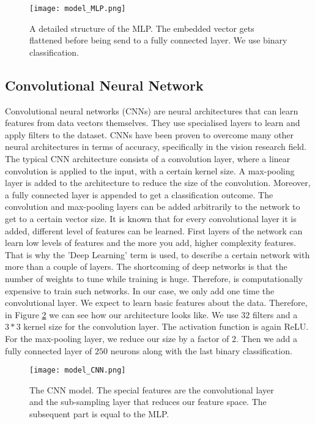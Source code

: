 \documentclass[conference]{IEEEtran}
\theoremstyle{plain}
\theoremstyle{definition}
\theoremstyle{remark}
\begin{document}
\begin{figure}[tbp!]
	\centering
	\texttt{[image: model\_MLP.png]}
	\caption[bla.]{A detailed structure of the MLP. The embedded vector gets flattened before being send to a fully connected layer. We use binary classification.}
	\label{fig:mlp}
\end{figure}
\newpage
\subsection{Convolutional Neural Network}
Convolutional neural networks (CNNs) \cite{cnn, cnn2} are neural architectures that can learn features from data vectors themselves. They use specialised layers to learn and apply filters to the dataset. CNNs have been proven to overcome many other neural architectures in terms of accuracy, specifically in the vision research field. The typical CNN architecture consists of a convolution layer, where a linear convolution is applied to the input, with a certain kernel size. A max-pooling layer is added to the architecture to reduce the size of the convolution. Moreover, a fully connected layer is appended to get a classification outcome. The convolution and max-pooling layers can be added arbitrarily to the network to get to a certain vector size. It is known that for every convolutional layer it is added, different level of features can be learned. First layers of the network can learn low levels of features and the more you add, higher complexity features. That is why the 'Deep Learning' term is used, to describe a certain network with more than a couple of layers. The shortcoming of deep networks is that the number of weights to tune while training is huge. Therefore, is computationally expensive to train such networks. In our case, we only add one time the convolutional layer. We expect to learn basic features about the data. Therefore, in Figure \ref{fig:cnn} we can see how our architecture looks like.  We use $32$ filters and a $3*3$ kernel size for the convolution layer. The activation function is again ReLU. For the max-pooling layer, we reduce our size by a factor of $2$. Then we add a fully connected layer of $250$ neurons along with the last binary classification.

\begin{figure}[tbh!]
	\centering
	\texttt{[image: model\_CNN.png]}
	\caption[bla.]{The CNN model. The special features are the convolutional layer and the sub-sampling layer that reduces our feature space. The subsequent part is equal to the MLP.}
	\label{fig:cnn}
\end{figure}
\newpage
\end{document}
